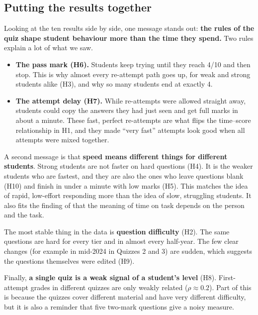 \subsection{Putting the results together}

Looking at the ten results side by side, one message stands out: \textbf{the
rules of the quiz shape student behaviour more than the time they spend.} Two
rules explain a lot of what we saw.

\begin{itemize}
  \item \textbf{The pass mark (H6).} Students keep trying until they reach
        4/10 and then stop. This is why almost every re-attempt path goes up,
        for weak and strong students alike (H3), and why so many students end
        at exactly 4.
  \item \textbf{The attempt delay (H7).} While re-attempts were allowed
        straight away, students could copy the answers they had just seen and
        get full marks in about a minute. These fast, perfect re-attempts are
        what flips the time--score relationship in H1, and they made ``very
        fast'' attempts look good when all attempts were mixed together.
\end{itemize}

A second message is that \textbf{speed means different things for different
students}. Strong students are not faster on hard questions (H4). It is the
weaker students who are fastest, and they are also the ones who leave questions
blank (H10) and finish in under a minute with low marks (H5). This matches the
idea of rapid, low-effort responding \citep{wise2005response} more than the
idea of slow, struggling students. It also fits the finding of
\citet{goldhammer2014time} that the meaning of time on task depends on the
person and the task.

The most stable thing in the data is \textbf{question difficulty} (H2). The
same questions are hard for every tier and in almost every half-year. The few
clear changes (for example in mid-2024 in Quizzes 2 and 3) are sudden, which
suggests the questions themselves were edited (H9).

Finally, \textbf{a single quiz is a weak signal of a student's level} (H8).
First-attempt grades in different quizzes are only weakly related
($\rho \approx 0.2$). Part of this is because the quizzes cover different
material and have very different difficulty, but it is also a reminder that
five two-mark questions give a noisy measure.

